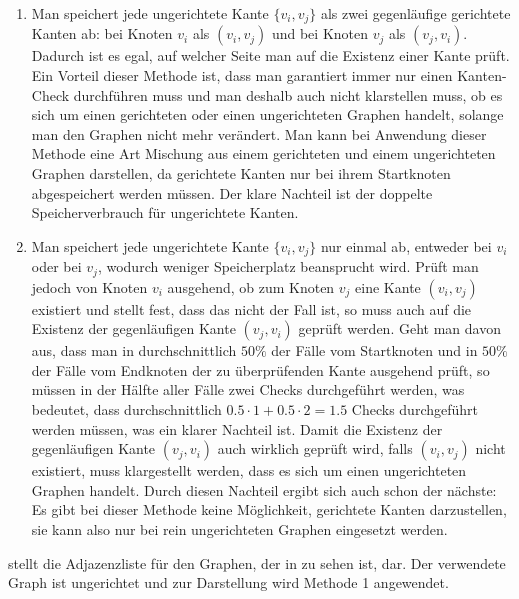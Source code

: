                 \begin{enumerate}
                    \item Man speichert jede ungerichtete Kante $\{v_i, v_j\}$ als zwei gegenläufige gerichtete Kanten ab: bei Knoten $v_i$ als $(v_i, v_j)$ und bei Knoten $v_j$ als $(v_j, v_i)$. Dadurch ist es egal, auf welcher Seite man auf die Existenz einer Kante prüft. Ein Vorteil dieser Methode ist, dass man garantiert immer nur einen Kanten-Check durchführen muss und man deshalb auch nicht klarstellen muss, ob es sich um einen gerichteten oder einen ungerichteten Graphen handelt, solange man den Graphen nicht mehr verändert. Man kann bei Anwendung dieser Methode eine Art Mischung aus einem gerichteten und einem ungerichteten Graphen darstellen, da gerichtete Kanten nur bei ihrem Startknoten abgespeichert werden müssen. Der klare Nachteil ist der doppelte Speicherverbrauch für ungerichtete Kanten.

                    \item Man speichert jede ungerichtete Kante $\{v_i, v_j\}$  nur einmal ab, entweder bei $v_i$ oder bei $v_j$, wodurch weniger Speicherplatz beansprucht wird. Prüft man jedoch von Knoten $v_i$ ausgehend, ob zum Knoten $v_j$ eine Kante $(v_i, v_j)$ existiert und stellt fest, dass das nicht der Fall ist, so muss auch auf die Existenz der gegenläufigen Kante $(v_j, v_i)$ geprüft werden. Geht man davon aus, dass man in durchschnittlich $50 \%$ der Fälle vom Startknoten und in $50 \%$ der Fälle vom Endknoten der zu überprüfenden Kante ausgehend prüft, so müssen in der Hälfte aller Fälle zwei Checks durchgeführt werden, was bedeutet, dass durchschnittlich $0.5 \cdot 1 + 0.5 \cdot 2 = 1.5$ Checks durchgeführt werden müssen, was ein klarer Nachteil ist. Damit die Existenz der gegenläufigen Kante $(v_j, v_i)$ auch wirklich geprüft wird, falls $(v_i, v_j)$ nicht existiert, muss klargestellt werden, dass es sich um einen ungerichteten Graphen handelt. Durch diesen Nachteil ergibt sich auch schon der nächste: Es gibt bei dieser Methode keine Möglichkeit, gerichtete Kanten darzustellen, sie kann also nur bei rein ungerichteten Graphen eingesetzt werden.
                \end{enumerate}
                
                 stellt die Adjazenzliste für den Graphen, der in  zu sehen ist, dar. Der verwendete Graph ist ungerichtet und zur Darstellung wird Methode 1 angewendet. \cite{EZ:Web31, EZ:Web40}
    
